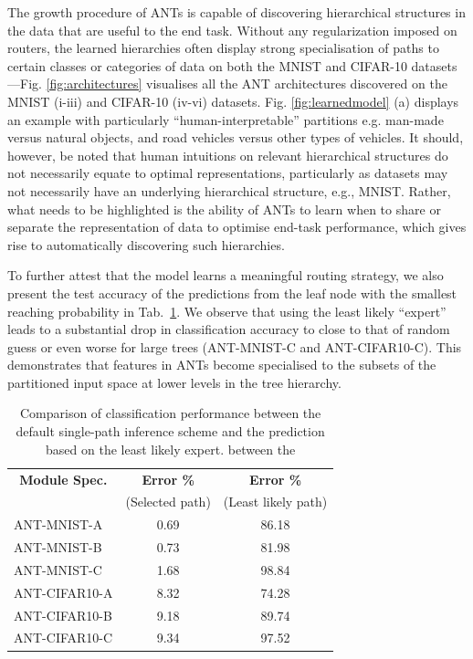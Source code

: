 The growth procedure of ANTs is capable of discovering hierarchical structures in the data that are useful to the end task. Without any regularization imposed on routers, the learned hierarchies often display strong specialisation of paths to certain classes or categories of data on both the MNIST and CIFAR-10 datasets---Fig. \ref{fig:architectures} visualises all the ANT architectures discovered on the MNIST (i-iii) and CIFAR-10 (iv-vi) datasets. Fig. \ref{fig:learnedmodel} (a) displays an example with particularly ``human-interpretable'' partitions e.g. man-made versus natural objects, and road vehicles versus other types of vehicles. It should, however, be noted that human intuitions on relevant hierarchical structures do not necessarily equate to optimal representations, particularly as datasets may not necessarily have an underlying hierarchical structure, e.g., MNIST. Rather, what needs to be highlighted is the ability of ANTs to learn when to share or separate the representation of data to optimise end-task performance, which gives rise to automatically discovering such hierarchies. 

To further attest that the model learns a meaningful routing strategy, we also present the test accuracy of the predictions from the leaf node with the smallest reaching probability in Tab.~\ref{tab:test_routers}. We observe that using the least likely ``expert'' leads to a substantial drop in classification accuracy to close to that of random guess or even worse for large trees (ANT-MNIST-C and ANT-CIFAR10-C). This demonstrates that features in ANTs become specialised to the subsets of the partitioned input space at lower levels in the tree hierarchy. 

\begin{table}[h]
	\caption {Comparison of classification performance between the default single-path inference scheme and the prediction based on the least likely expert. \label{tab:test_routers} between the }
	\footnotesize
	\center
	\begin{tabular}{|l|c|c|}
		\hline
		\multicolumn{1}{|c}{\textbf{Module Spec.}} &  \multicolumn{1}{|c|}{\textbf{Error \%}} & \multicolumn{1}{c|}{\textbf{Error \%}}  \\
		&(Selected path) & (Least likely path)  \\
		\hline
		ANT-MNIST-A &0.69 & 86.18  \\
		ANT-MNIST-B &0.73 & 81.98  \\
		ANT-MNIST-C &1.68 & 98.84  \\
		ANT-CIFAR10-A & 8.32 & 74.28  \\
		ANT-CIFAR10-B & 9.18 & 89.74  \\
		ANT-CIFAR10-C & 9.34 & 97.52  \\
		\hline
	\end{tabular}
\end{table}

